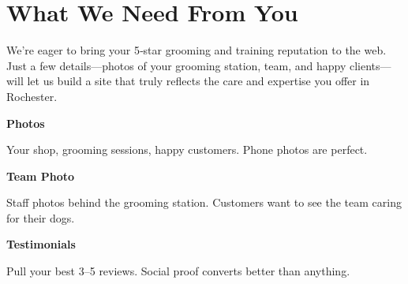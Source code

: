 \documentclass[11pt,letterpaper]{article}
\begin{document}
\vspace{0.2em}

\section*{What We Need From You}

We’re eager to bring your 5‑star grooming and training reputation to the web. Just a few details—photos of your grooming station, team, and happy clients—will let us build a site that truly reflects the care and expertise you offer in Rochester.

\vspace{0.12em}

\noindent\begin{minipage}[t]{0.48\textwidth}
\begin{tcolorbox}[colframe=accent-teal, boxrule=1pt, left=0.7em, right=0.7em, top=0.5em, bottom=0.5em, arc=4pt, boxsep=0pt]
{\bfseries\small\color{accent-teal}Photos}

\vspace{0.15em}

{\small Your shop, grooming sessions, happy customers. Phone photos are perfect.}
\end{tcolorbox}

\vspace{0.1em}

\begin{tcolorbox}[colframe=accent-teal, boxrule=1pt, left=0.7em, right=0.7em, top=0.5em, bottom=0.5em, arc=4pt, boxsep=0pt]
{\bfseries\small\color{accent-teal}Team Photo}

\vspace{0.15em}

{\small Staff photos behind the grooming station. Customers want to see the team caring for their dogs.}
\end{tcolorbox}

\vspace{0.1em}

\begin{tcolorbox}[colframe=accent-teal, boxrule=1pt, left=0.7em, right=0.7em, top=0.5em, bottom=0.5em, arc=4pt, boxsep=0pt]
{\bfseries\small\color{accent-teal}Testimonials}

\vspace{0.15em}

{\small Pull your best 3--5 reviews. Social proof converts better than anything.}
\end{tcolorbox}
\end{minipage}
\end{document}
